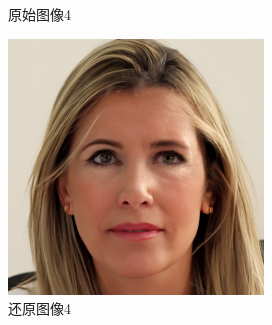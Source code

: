\begin{figure}[H]
\begin{minipage}[b]{0.3\linewidth}
    \caption{原始图像4}
    \label{original image 4}
  \end{minipage}
\hspace{0.1cm}
  \begin{minipage}[b]{0.3\linewidth}
    \includegraphics[width=\linewidth]{Picture/recon/recon_box.png}
    \caption{还原图像4}
    \label{inpainted image 4}
  \end{minipage}
  \label{整块损坏图像}
\end{figure}



